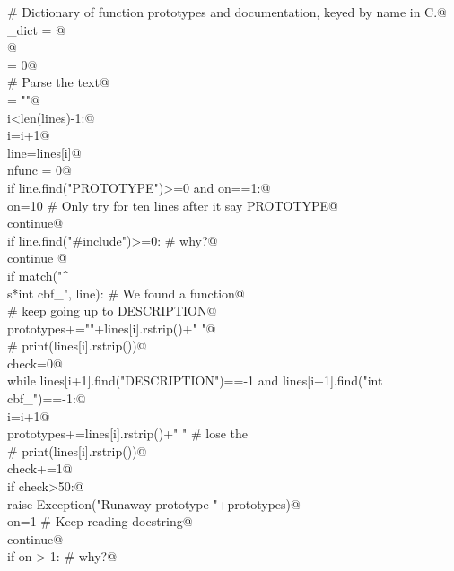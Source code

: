 \documentclass[10pt,a4paper,twoside,notitlepage]{article}
\begin{document}
\begin{flushleft}
\begin{list}{}{}
\mbox{}\verb@# Dictionary of function prototypes and documentation, keyed by name in C.@\\
\mbox{}\verb@name_dict = {}@\\
\mbox{}@\\
\mbox{}\verb@debug = 0@\\
\mbox{}\verb@# Parse the text@\\
\mbox{}\verb@prototypes = ""@\\
\mbox{}\verb@while i<len(lines)-1:@\\
\mbox{}\verb@   i=i+1@\\
\mbox{}\verb@   line=lines[i]@\\
\mbox{}\verb@   nfunc = 0@\\
\mbox{}\verb@   if line.find("PROTOTYPE")>=0 and on==1:@\\
\mbox{}\verb@      on=10 # Only try for ten lines after it say PROTOTYPE@\\
\mbox{}\verb@      continue@\\
\mbox{}\verb@   if line.find("#include")>=0: # why?@\\
\mbox{}\verb@      continue @\\
\mbox{}\verb@   if match("^\\s*int cbf_", line): # We found a function@\\
\mbox{}\verb@      # keep going up to DESCRIPTION@\\
\mbox{}\verb@      prototypes+=""+lines[i].rstrip()+" "@\\
\mbox{}\verb@      # print(lines[i].rstrip())@\\
\mbox{}\verb@      check=0@\\
\mbox{}\verb@      while lines[i+1].find("DESCRIPTION")==-1 and lines[i+1].find("int cbf_")==-1:@\\
\mbox{}\verb@         i=i+1@\\
\mbox{}\verb@         prototypes+=lines[i].rstrip()+" " # lose the \n@\\
\mbox{}\verb@         # print(lines[i].rstrip())@\\
\mbox{}\verb@         check+=1@\\
\mbox{}\verb@         if check>50:@\\
\mbox{}\verb@            raise Exception("Runaway prototype "+prototypes)@\\
\mbox{}\verb@      on=1 # Keep reading docstring@\\
\mbox{}\verb@      continue@\\
\mbox{}\verb@   if on > 1: # why?@\\

\end{list}
\end{flushleft}
\end{document}
